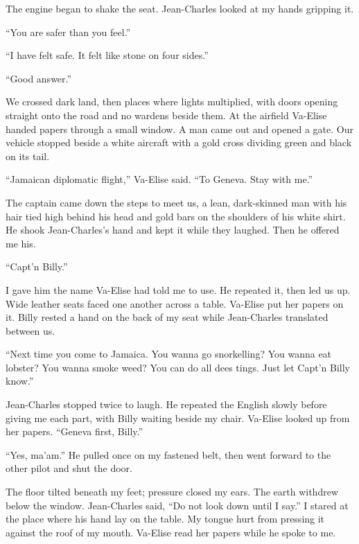The engine began to shake the seat. Jean-Charles looked at my hands gripping it.\par

``You are safer than you feel.''\par

``I have felt safe. It felt like stone on four sides.''\par

``Good answer.''\par

We crossed dark land, then places where lights multiplied, with doors opening straight onto the road and no wardens beside them. At the airfield Va-Elise handed papers through a small window. A man came out and opened a gate. Our vehicle stopped beside a white aircraft with a gold cross dividing green and black on its tail.\par

``Jamaican diplomatic flight,'' Va-Elise said. ``To Geneva. Stay with me.''\par

The captain came down the steps to meet us, a lean, dark-skinned man with his hair tied high behind his head and gold bars on the shoulders of his white shirt. He shook Jean-Charles's hand and kept it while they laughed. Then he offered me his.\par

``Capt'n Billy.''\par

I gave him the name Va-Elise had told me to use. He repeated it, then led us up. Wide leather seats faced one another across a table. Va-Elise put her papers on it. Billy rested a hand on the back of my seat while Jean-Charles translated between us.\par

``Next time you come to Jamaica. You wanna go snorkelling? You wanna eat lobster? You wanna smoke weed? You can do all dees tings. Just let Capt'n Billy know.''\par

Jean-Charles stopped twice to laugh. He repeated the English slowly before giving me each part, with Billy waiting beside my chair. Va-Elise looked up from her papers. ``Geneva first, Billy.''\par

``Yes, ma'am.'' He pulled once on my fastened belt, then went forward to the other pilot and shut the door.\par

The floor tilted beneath my feet; pressure closed my ears. The earth withdrew below the window. Jean-Charles said, ``Do not look down until I say.'' I stared at the place where his hand lay on the table. My tongue hurt from pressing it against the roof of my mouth. Va-Elise read her papers while he spoke to me.\par

